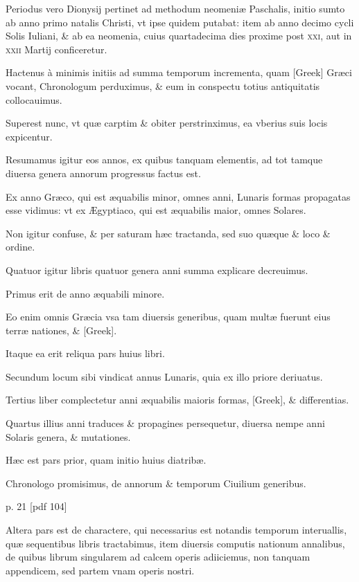 Periodus vero Dionysij pertinet ad methodum
neomeniæ Paschalis, initio sumto ab anno primo natalis Christi, vt
ipse quidem putabat: item ab anno decimo cycli Solis Iuliani, \& ab
ea neomenia, cuius quartadecima dies proxime post
 \textsc{xxi}, aut in \textsc{xxii}
Martij conficeretur.

Hactenus à minimis initiis ad summa temporum
incrementa, quam \textgreek{[Greek]} Græci vocant, Chronologum
perduximus, \& eum in conspectu totius antiquitatis collocauimus.

Superest nunc, vt quæ carptim \& obiter perstrinximus, ea vberius
suis locis expicentur.

Resumamus igitur eos annos, ex quibus tanquam
elementis, ad tot tamque diuersa genera annorum progressus
factus est.

Ex anno Græco, qui est æquabilis minor, omnes anni, Lunaris
formas propagatas esse vidimus: vt ex Ægyptiaco, qui est æquabilis
maior, omnes Solares.

Non igitur confuse, \& per saturam hæc
tractanda, sed suo quæque \& loco \& ordine.

Quatuor igitur libris
quatuor genera anni summa explicare decreuimus.

Primus erit de
anno æquabili minore.

Eo enim omnis Græcia vsa tam diuersis generibus,
quam multæ fuerunt eius terræ nationes, \& \textgreek{[Greek]}.

Itaque
ea erit reliqua pars huius libri.

Secundum locum sibi vindicat annus
Lunaris, quia ex illo priore deriuatus.

Tertius liber complectetur anni
æquabilis maioris formas, \textgreek{[Greek]}, \& differentias.

Quartus illius anni
traduces \& propagines persequetur, diuersa nempe anni Solaris genera,
\& mutationes.

Hæc est pars prior, quam initio huius diatribæ.

Chronologo promisimus, de annorum \& temporum Ciuilium generibus.



p. 21 [pdf 104]


Altera pars est de charactere, qui necessarius est notandis temporum
interuallis, quæ sequentibus libris tractabimus, item diuersis
computis nationum annalibus, de quibus librum singularem ad calcem
operis adiiciemus, non tanquam appendicem, sed partem vnam
operis nostri.

